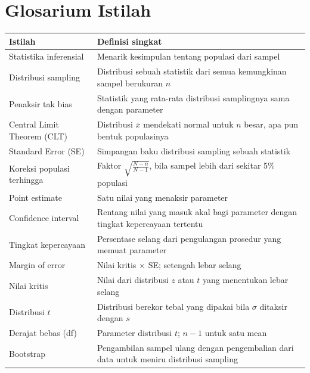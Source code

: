 \documentclass[
  indonesian,
  letterpaper,
]{book}
\newcounter{none} %
\begin{document}
\section{Glosarium Istilah}\label{glosarium-istilah}

{\def\LTcaptype{none} %
\begin{longtable}[]{@{}
  >{\raggedright\arraybackslash}p{}
  >{\raggedright\arraybackslash}p{}@{}}
\toprule\noalign{}
\begin{minipage}[b]{\linewidth}\raggedright
Istilah
\end{minipage} & \begin{minipage}[b]{\linewidth}\raggedright
Definisi singkat
\end{minipage} \\
\midrule\noalign{}
\endhead
\bottomrule\noalign{}
\endlastfoot
Statistika inferensial & Menarik kesimpulan tentang populasi dari
sampel \\
Distribusi sampling & Distribusi sebuah statistik dari semua kemungkinan
sampel berukuran \(n\) \\
Penaksir tak bias & Statistik yang rata-rata distribusi samplingnya sama
dengan parameter \\
Central Limit Theorem (CLT) & Distribusi \(\bar{x}\) mendekati normal
untuk \(n\) besar, apa pun bentuk populasinya \\
Standard Error (SE) & Simpangan baku distribusi sampling sebuah
statistik \\
Koreksi populasi terhingga & Faktor
\(\displaystyle\sqrt{\frac{N-n}{N-1}}\), bila sampel lebih dari sekitar
5\% populasi \\
Point estimate & Satu nilai yang menaksir parameter \\
Confidence interval & Rentang nilai yang masuk akal bagi parameter
dengan tingkat kepercayaan tertentu \\
Tingkat kepercayaan & Persentase selang dari pengulangan prosedur yang
memuat parameter \\
Margin of error & Nilai kritis \(\times\) SE; setengah lebar selang \\
Nilai kritis & Nilai dari distribusi \(z\) atau \(t\) yang menentukan
lebar selang \\
Distribusi \(t\) & Distribusi berekor tebal yang dipakai bila \(\sigma\)
ditaksir dengan \(s\) \\
Derajat bebas (df) & Parameter distribusi \(t\); \(n-1\) untuk satu
mean \\
Bootstrap & Pengambilan sampel ulang dengan pengembalian dari data untuk
meniru distribusi sampling \\
\end{longtable}
}
\end{document}

